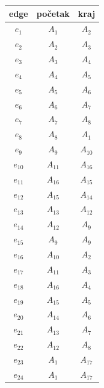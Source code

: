 \documentclass[a4paper,12pt]{article}
\begin{document}
    \begin{center}
        \begin{tabular}{||c | c | c ||} 
         \hline
         edge & početak & kraj  \\ [0.5ex] 
         \hline
         $e_1$ & $A_{1}$ & $A_{2}$ \\ 
         \hline
         $e_2$ & $A_{2}$ & $A_{3}$  \\
         \hline
         $e_3$ & $A_{3}$ & $A_{4}$  \\
         \hline
         $e_4$ & $A_{4}$ & $A_{5}$  \\
         \hline
         $e_5$ & $A_{5}$ & $A_{6}$ \\ 
         \hline
         $e_6$ & $A_{6}$ & $A_{7}$  \\
         \hline
         $e_7$ & $A_{7}$ & $A_{8}$  \\
         \hline
         $e_8$ & $A_{8}$  & $A_{1}$ \\
         \hline
         $e_9$ & $A_{9}$ & $A_{10}$  \\
         \hline
         $e_{10}$& $A_{11}$ & $A_{16}$ \\
         \hline
         $e_{11}$ & $A_{16}$ & $A_{15}$   \\
         \hline
         $e_{12}$ & $A_{15}$ & $A_{14}$  \\
         \hline
         $e_{13}$ & $A_{13}$ & $A_{12}$   \\ 
         \hline
         $e_{14}$ & $A_{12}$ & $A_{9}$  \\
         \hline
         $e_{15}$ & $A_{9}$ & $A_{9}$  \\
         \hline
         $e_{16}$ & $A_{10}$ & $A_{2}$  \\
         \hline
         $e_{17}$ & $A_{11}$  & $A_{3}$ \\
         \hline
         $e_{18}$ & $A_{16}$ & $A_{4}$ \\ 
         \hline
         $e_{19}$& $A_{15}$ & $A_{5}$ \\
         \hline
         $e_{20}$ & $A_{14}$ & $A_{6}$   \\
         \hline
         $e_{21}$ & $A_{13}$ & $A_{7}$  \\
         \hline
         $e_{22}$ & $A_{12 }$& $A_{8}$ \\ 
         \hline
         $e_{23}$ & $A_{1}$ & $A_{17}$  \\
         \hline
         $e_{24}$ & $A_{1}$ & $A_{17}$   \\
         \hline

\end{tabular}
\end{center}
\end{document}

